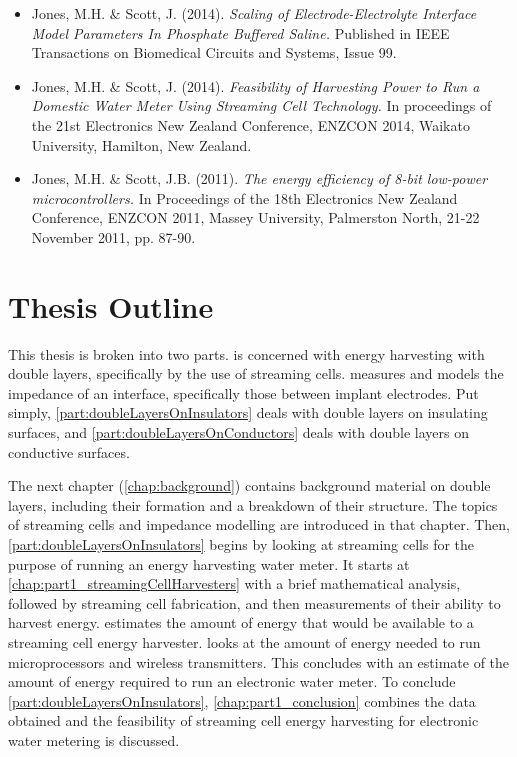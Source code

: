   \begin{itemize}
    \item Jones, M.H. \& Scott, J. (2014). \emph{Scaling of Electrode-Electrolyte Interface Model Parameters In Phosphate Buffered Saline.} Published in IEEE Transactions on Biomedical Circuits and Systems, Issue 99.
    \item Jones, M.H. \& Scott, J. (2014). \emph{Feasibility of Harvesting Power to Run a Domestic Water Meter Using Streaming Cell Technology.} In proceedings of the 21st Electronics New Zealand Conference, ENZCON 2014, Waikato University, Hamilton, New Zealand.
    \item Jones, M.H. \& Scott, J.B. (2011). \emph{The energy efficiency of 8-bit low-power microcontrollers.} In Proceedings of the 18th Electronics New Zealand Conference, ENZCON 2011, Massey University, Palmerston North, 21-22 November 2011, pp. 87-90.
  \end{itemize}


\section{Thesis Outline}


  This thesis is broken into two parts.
   is concerned with energy harvesting with double layers, specifically by the use of streaming cells.
   measures and models the impedance of an interface, specifically those between implant electrodes.
  Put simply, \cref{part:doubleLayersOnInsulators} deals with double layers on insulating surfaces, and \cref{part:doubleLayersOnConductors} deals with double layers on conductive surfaces.

  The next chapter (\cref{chap:background}) contains background material on double layers, including their formation and a breakdown of their structure.
  The topics of streaming cells and impedance modelling are introduced in that chapter.
  Then, \cref{part:doubleLayersOnInsulators} begins by looking at streaming cells for the purpose of running an energy harvesting water meter.
  It starts at \cref{chap:part1_streamingCellHarvesters} with a brief mathematical analysis, followed by streaming cell fabrication, and then measurements of their ability to harvest energy.
   estimates the amount of energy that would be available to a streaming cell energy harvester.
   looks at the amount of energy needed to run microprocessors and wireless transmitters.
  This concludes with an estimate of the amount of energy required to run an electronic water meter.
  To conclude \cref{part:doubleLayersOnInsulators}, \cref{chap:part1_conclusion} combines the data obtained and the feasibility of streaming cell energy harvesting for electronic water metering is discussed.

